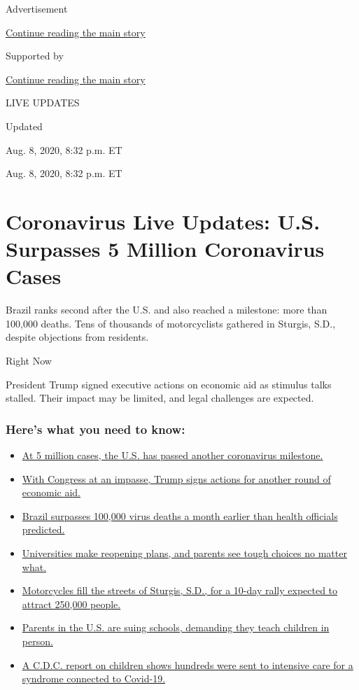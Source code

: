 Advertisement

\protect\hyperlink{after-top}{Continue reading the main story}

Supported by

\protect\hyperlink{after-sponsor}{Continue reading the main story}

LIVE UPDATES

Updated~

Aug. 8, 2020, 8:32 p.m. ET

Aug. 8, 2020, 8:32 p.m. ET

\hypertarget{coronavirus-live-updates-us-surpasses-5-million-coronavirus-cases}{%
\section{Coronavirus Live Updates: U.S. Surpasses 5 Million Coronavirus
Cases}\label{coronavirus-live-updates-us-surpasses-5-million-coronavirus-cases}}

Brazil ranks second after the U.S. and also reached a milestone: more
than 100,000 deaths. Tens of thousands of motorcyclists gathered in
Sturgis, S.D., despite objections from residents.

Right Now

President Trump signed executive actions on economic aid as stimulus
talks stalled. Their impact may be limited, and legal challenges are
expected.

\hypertarget{heres-what-you-need-to-know}{%
\subsubsection{Here's what you need to
know:}\label{heres-what-you-need-to-know}}

\begin{itemize}
\tightlist
\item
  \protect\hyperlink{link-697eb3e1}{At 5 million cases, the U.S. has
  passed another coronavirus milestone.}
\item
  \protect\hyperlink{link-5b7b4fa2}{With Congress at an impasse, Trump
  signs actions for another round of economic aid.}
\item
  \protect\hyperlink{link-680eccee}{Brazil surpasses 100,000 virus
  deaths a month earlier than health officials predicted.}
\item
  \protect\hyperlink{link-7bd2f2ea}{Universities make reopening plans,
  and parents see tough choices no matter what.}
\item
  \protect\hyperlink{link-6d42ce45}{Motorcycles fill the streets of
  Sturgis, S.D., for a 10-day rally expected to attract 250,000 people.}
\item
  \protect\hyperlink{link-458f8def}{Parents in the U.S. are suing
  schools, demanding they teach children in person.}
\item
  \protect\hyperlink{link-57c61e05}{A C.D.C. report on children shows
  hundreds were sent to intensive care for a syndrome connected to
  Covid-19.}
\end{itemize}

